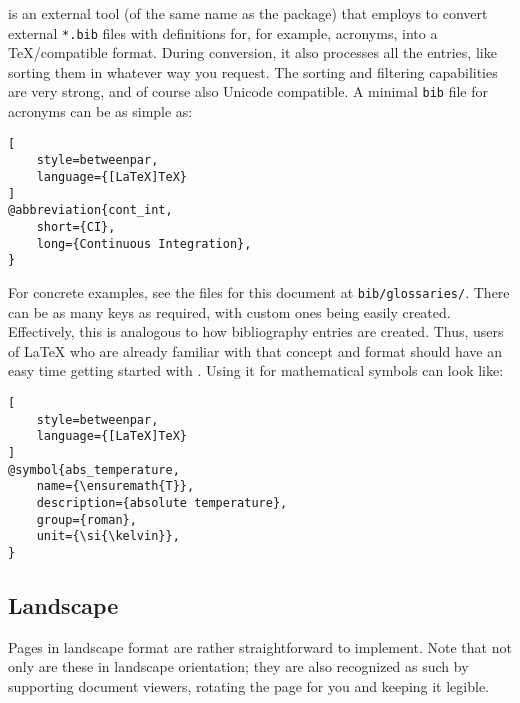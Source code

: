  is an external tool (of the same name as the package) that
 employs to convert external \texttt{*.bib} files with
definitions for, for example, acronyms, into a \TeX{}\-/compatible format.
During conversion, it also processes all the entries, like sorting them in whatever
way you request.
The sorting and filtering capabilities are very strong, and of course also Unicode
compatible.
A minimal \texttt{bib} file for acronyms can be as simple as:
\begin{lstlisting}[
    style=betweenpar,
    language={[LaTeX]TeX}
]
@abbreviation{cont_int,
    short={CI},
    long={Continuous Integration},
}
\end{lstlisting}
For concrete examples, see the files for this document at \texttt{bib/glossaries/}.
There can be as many keys as required, with custom ones being easily created.
Effectively, this is analogous to how bibliography entries are created.
Thus, users of \LaTeX{} who are already familiar with that concept and format
should have an easy time getting started with .
Using it for mathematical symbols can look like:
\begin{lstlisting}[
    style=betweenpar,
    language={[LaTeX]TeX}
]
@symbol{abs_temperature,
    name={\ensuremath{T}},
    description={absolute temperature},
    group={roman},
    unit={\si{\kelvin}},
}
\end{lstlisting}

\begin{landscape}
    \section{Landscape}

    Pages in landscape format are rather straightforward to implement.
    Note that not only are these in landscape orientation; they are also recognized
    as such by supporting document viewers, rotating the page for you and keeping
    it legible.
\end{landscape}
